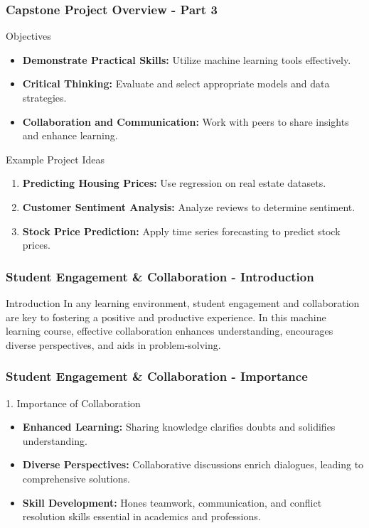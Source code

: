 \documentclass[aspectratio=169]{beamer}
\begin{document}
\begin{frame}[fragile]
    \frametitle{Capstone Project Overview - Part 3}
    \begin{block}{Objectives}
        \begin{itemize}
            \item \textbf{Demonstrate Practical Skills:} Utilize machine learning tools effectively.
            \item \textbf{Critical Thinking:} Evaluate and select appropriate models and data strategies.
            \item \textbf{Collaboration and Communication:} Work with peers to share insights and enhance learning.
        \end{itemize}
    \end{block}

    \begin{block}{Example Project Ideas}
        \begin{enumerate}
            \item \textbf{Predicting Housing Prices:} Use regression on real estate datasets.
            \item \textbf{Customer Sentiment Analysis:} Analyze reviews to determine sentiment.
            \item \textbf{Stock Price Prediction:} Apply time series forecasting to predict stock prices.
        \end{enumerate}
    \end{block}
\end{frame}

\begin{frame}[fragile]
    \frametitle{Student Engagement \& Collaboration - Introduction}
    \begin{block}{Introduction}
        In any learning environment, student engagement and collaboration are key to fostering a positive and productive experience. In this machine learning course, effective collaboration enhances understanding, encourages diverse perspectives, and aids in problem-solving.
    \end{block}
\end{frame}

\begin{frame}[fragile]
    \frametitle{Student Engagement \& Collaboration - Importance}
    \begin{block}{1. Importance of Collaboration}
        \begin{itemize}
            \item \textbf{Enhanced Learning:} Sharing knowledge clarifies doubts and solidifies understanding.
            \item \textbf{Diverse Perspectives:} Collaborative discussions enrich dialogues, leading to comprehensive solutions.
            \item \textbf{Skill Development:} Hones teamwork, communication, and conflict resolution skills essential in academics and professions.
        \end{itemize}
    \end{block}
\end{frame}
\end{document}
